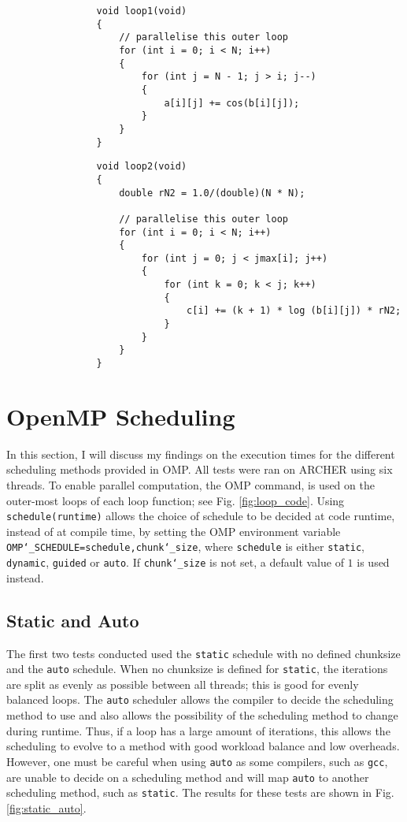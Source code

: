 \documentclass[11pt, a4paper]{article}
\begin{document}
		\begin{figure*}
			\begin{verbatim}
				void loop1(void)
				{
					// parallelise this outer loop
					for (int i = 0; i < N; i++)
					{
						for (int j = N - 1; j > i; j--)
						{
							a[i][j] += cos(b[i][j]);
						}
					}
				}
			\end{verbatim}
			
			\begin{verbatim}
				void loop2(void)
				{
					double rN2 = 1.0/(double)(N * N);
	
					// parallelise this outer loop
					for (int i = 0; i < N; i++)
					{
						for (int j = 0; j < jmax[i]; j++)
						{
							for (int k = 0; k < j; k++)
							{
								c[i] += (k + 1) * log (b[i][j]) * rN2;
							}
						}
					}
				}
			\end{verbatim}
			\caption{The two benchmark loops being used. Both loops provide an unbalanced workload.}
			\label{fig:loop_code}
		\end{figure*}
			
	\section{OpenMP Scheduling}
		In this section, I will discuss my findings on the execution times for the different scheduling methods provided in OMP. All tests were ran on ARCHER using six threads. To enable parallel computation, the OMP command,  \noindent is used on the outer-most loops of each loop function; see Fig. \ref{fig:loop_code}. Using \texttt{schedule(runtime)} allows the choice of schedule to be decided at code runtime, instead of at compile time, by setting the OMP environment variable \texttt{OMP\char`_SCHEDULE=schedule,chunk\char`_size}, where \texttt{schedule} is either \texttt{static}, \texttt{dynamic}, \texttt{guided} or \texttt{auto}. If \texttt{chunk\char`_size} is not set, a default value of $1$ is used instead.
	
		\subsection{Static and Auto}
			The first two tests conducted used the \texttt{static} schedule with no defined chunksize and the \texttt{auto} schedule. When no chunksize is defined for \texttt{static}, the iterations are split as evenly as possible between all threads; this is good for evenly balanced loops. The \texttt{auto} scheduler allows the compiler to decide the scheduling method to use and also allows the possibility of the scheduling method to change during runtime. Thus, if a loop has a large amount of iterations, this allows the scheduling to evolve to a method with good workload balance and low overheads. However, one must be careful when using \texttt{auto} as some compilers, such as \texttt{gcc}, are unable to decide on a scheduling method and will map \texttt{auto} to another scheduling method, such as \texttt{static}. The results for these tests are shown in Fig. \ref{fig:static_auto}.
			
\end{document}
